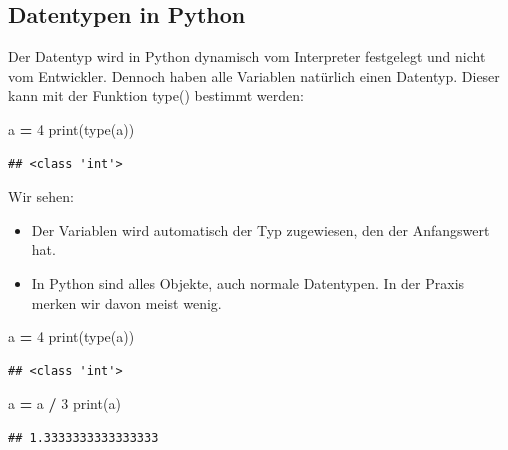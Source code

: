 \documentclass[
]{book}
\newenvironment{Shaded}{\begin{snugshade}}{\end{snugshade}}
\newcommand{\BuiltInTok}[1]{#1}
\newcommand{\DecValTok}[1]{\textcolor[rgb]{0.00,0.00,0.81}{#1}}
\newcommand{\NormalTok}[1]{#1}
\newcommand{\OperatorTok}[1]{\textcolor[rgb]{0.81,0.36,0.00}{\textbf{#1}}}
\begin{document}
\hypertarget{datentypen-in-python}{%
\subsection*{Datentypen in Python}\label{datentypen-in-python}}

Der Datentyp wird in Python dynamisch vom Interpreter festgelegt und nicht vom Entwickler. Dennoch haben alle Variablen natürlich einen Datentyp. Dieser kann mit der Funktion type() bestimmt werden:

\begin{Shaded}
\begin{Highlighting}[]
\NormalTok{a }\OperatorTok{=} \DecValTok{4}
\BuiltInTok{print}\NormalTok{(}\BuiltInTok{type}\NormalTok{(a))}
\end{Highlighting}
\end{Shaded}

\begin{verbatim}
## <class 'int'>
\end{verbatim}

Wir sehen:

\begin{itemize}
\item
  Der Variablen wird automatisch der Typ zugewiesen, den der Anfangswert hat.
\item
  In Python sind alles Objekte, auch normale Datentypen. In der Praxis merken wir davon meist wenig.
\end{itemize}

\begin{Shaded}
\begin{Highlighting}[]
\NormalTok{a }\OperatorTok{=} \DecValTok{4}
\BuiltInTok{print}\NormalTok{(}\BuiltInTok{type}\NormalTok{(a))}
\end{Highlighting}
\end{Shaded}

\begin{verbatim}
## <class 'int'>
\end{verbatim}

\begin{Shaded}
\begin{Highlighting}[]
\NormalTok{a }\OperatorTok{=}\NormalTok{ a }\OperatorTok{/} \DecValTok{3}
\BuiltInTok{print}\NormalTok{(a)}
\end{Highlighting}
\end{Shaded}

\begin{verbatim}
## 1.3333333333333333
\end{verbatim}
\end{document}
